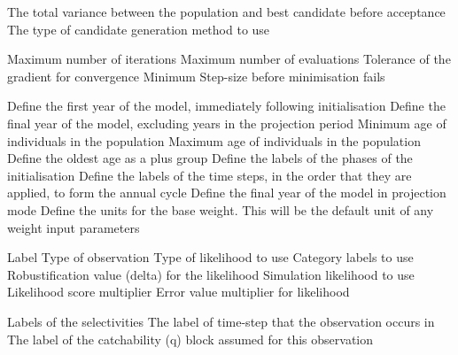  {The total variance between the population and best candidate before acceptance}
 {The type of candidate generation method to use}
\par\textbf{}\par
\par\textbf{}\par
{} {Maximum number of iterations}
 {Maximum number of evaluations}
 {Tolerance of the gradient for convergence}
 {Minimum Step-size before minimisation fails}
\par\par
{} {Define the first year of the model, immediately following initialisation}
 {Define the final year of the model, excluding years in the projection period}
 {Minimum age of individuals in the population}
 {Maximum age of individuals in the population}
 {Define the oldest age as a plus group}
 {Define the labels of the phases of the initialisation}
 {Define the labels of the time steps, in the order that they are applied, to form the annual cycle}
 {Define the final year of the model in projection mode}
 {}
 {Define the units for the base weight. This will be the default unit of any weight input parameters}
\par\par
{} {Label}
 {Type of observation}
 {Type of likelihood to use}
 {Category labels to use}
 {Robustification value (delta) for the likelihood}
 {Simulation likelihood to use}
 {Likelihood score multiplier}
 {Error value multiplier for likelihood}
\par\textbf{}\par
{} {Labels of the selectivities}
 {The label of time-step that the observation occurs in}
 {The label of the catchability (q) block assumed for this observation}
